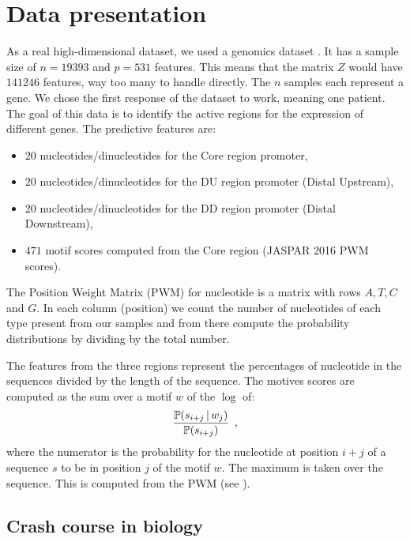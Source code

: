 \documentclass[../main.tex]{subfiles}
\begin{document}
\section{Data presentation}

As a real  high-dimensional dataset, we used a genomics dataset \citep{Bessiere_Taha_Petitprez_Vandel_Marin_Brehelin_Lebre_Lecellier}.
It has a sample size of $n=19393$ and $p=531$ features.
This means that the matrix $Z$ would have $141246$ features, \ie way too many to handle directly.
The $n$ samples each represent a gene.
We chose the first response of the dataset to work, meaning one patient.
The goal of this data is to identify the active regions for the expression of different genes.
The predictive features are:
\begin{itemize}
    \item $20$ nucleotides/dinucleotides for the Core region promoter,
    \item $20$ nucleotides/dinucleotides for the DU region promoter (Distal Upstream),
    \item $20$ nucleotides/dinucleotides for the DD region promoter (Distal Downstream),
    \item $471$ motif scores computed from the Core region (JASPAR 2016 PWM scores).
\end{itemize}

\begin{definition}
The Position Weight Matrix (PWM) for nucleotide is a matrix with rows $A, T, C$ and $G$.
In each column (position) we count the number of nucleotides of each type present from our samples and
from there compute the probability distributions by dividing by the total number.
\end{definition}

The features from the three regions represent the percentages of nucleotide in the sequences divided by the length of the sequence.
The motives scores are computed as the sum over a motif $w$ of the $\log$ of:
\[\frac{\mathbb{P}(s_{i+j}\,|\, w_j)}{\mathbb{P}(s_{i+j})}\enspace,\]
where the numerator is the probability for the nucleotide at position $i+j$ of a sequence $s$ to be in position $j$ of the motif $w$.
The maximum is taken over the sequence.
This is computed from the PWM (see ).

\subsection{Crash course in biology}
\end{document}
